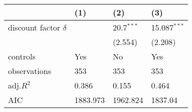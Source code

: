 \begin{tabular}{llll}
\hline
 & (1) & (2) & (3) \\
\hline
discount factor $\delta$ &  & 20.7$^{***}$ & 15.087$^{***}$ \\
 &  & (2.554) & (2.208) \\
controls & Yes & No & Yes \\
observations & 353 & 353 & 353 \\
adj.$R^2$ & 0.386 & 0.155 & 0.464 \\
AIC & 1883.973 & 1962.824 & 1837.04 \\
\hline
\end{tabular}
